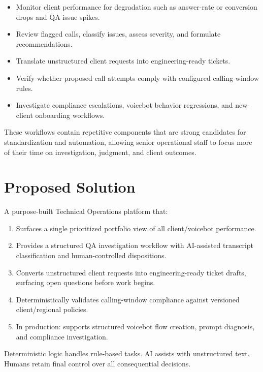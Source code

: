 \documentclass[11pt,a4paper]{article}
\begin{document}
\begin{itemize}
  \item Monitor client performance for degradation such as answer-rate or conversion drops and QA issue spikes.
  \item Review flagged calls, classify issues, assess severity, and formulate recommendations.
  \item Translate unstructured client requests into engineering-ready tickets.
  \item Verify whether proposed call attempts comply with configured calling-window rules.
  \item Investigate compliance escalations, voicebot behavior regressions, and new-client onboarding workflows.
\end{itemize}

These workflows contain repetitive components that are strong candidates for standardization and automation, allowing senior operational staff to focus more of their time on investigation, judgment, and client outcomes.

\section{Proposed Solution}

A purpose-built Technical Operations platform that:

\begin{enumerate}
  \item Surfaces a single prioritized portfolio view of all client/voicebot performance.
  \item Provides a structured QA investigation workflow with AI-assisted transcript classification and human-controlled dispositions.
  \item Converts unstructured client requests into engineering-ready ticket drafts, surfacing open questions before work begins.
  \item Deterministically validates calling-window compliance against versioned client/regional policies.
  \item In production: supports structured voicebot flow creation, prompt diagnosis, and compliance investigation.
\end{enumerate}

Deterministic logic handles rule-based tasks. AI assists with unstructured text. Humans retain final control over all consequential decisions.
\end{document}
